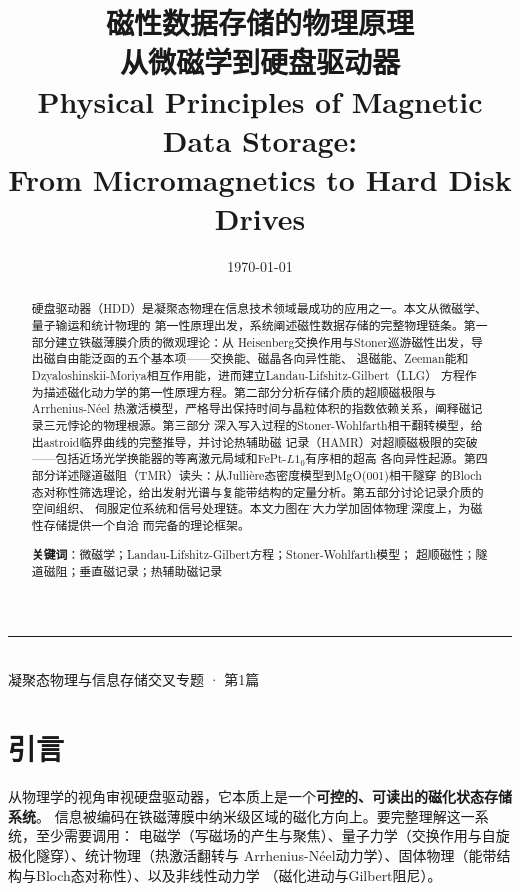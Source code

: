 \documentclass[11pt,a4paper,twoside]{article}
\title{
  {\Huge\bfseries 磁性数据存储的物理原理} \\[8pt]
  {\Large 从微磁学到硬盘驱动器} \\[12pt]
  {\normalsize Physical Principles of Magnetic Data Storage: \\
   From Micromagnetics to Hard Disk Drives}
}
\author{}
\date{\today}
\theoremstyle{definition}
\theoremstyle{plain}
\theoremstyle{remark}
\begin{document}
\maketitle

\begin{center}
\rule{0.8\textwidth}{0.5pt} \\[8pt]
{\small 凝聚态物理与信息存储交叉专题 · 第1篇} \\[4pt]
\end{center}

\begin{abstract}
\noindent
硬盘驱动器（HDD）是凝聚态物理在信息技术领域最成功的应用之一。本文从微磁学、量子输运和统计物理的
第一性原理出发，系统阐述磁性数据存储的完整物理链条。第一部分建立铁磁薄膜介质的微观理论：从
Heisenberg交换作用与Stoner巡游磁性出发，导出磁自由能泛函的五个基本项——交换能、磁晶各向异性能、
退磁能、Zeeman能和Dzyaloshinskii-Moriya相互作用能，进而建立Landau-Lifshitz-Gilbert（LLG）
方程作为描述磁化动力学的第一性原理方程。第二部分分析存储介质的超顺磁极限与Arrhenius-N\'{e}el
热激活模型，严格导出保持时间与晶粒体积的指数依赖关系，阐释磁记录三元悖论的物理根源。第三部分
深入写入过程的Stoner-Wohlfarth相干翻转模型，给出astroid临界曲线的完整推导，并讨论热辅助磁
记录（HAMR）对超顺磁极限的突破——包括近场光学换能器的等离激元局域和FePt-$L1_0$有序相的超高
各向异性起源。第四部分详述隧道磁阻（TMR）读头：从Julli\`{e}re态密度模型到MgO(001)相干隧穿
的Bloch态对称性筛选理论，给出发射光谱与复能带结构的定量分析。第五部分讨论记录介质的空间组织、
伺服定位系统和信号处理链。本文力图在\"四大力学加固体物理\"的深度上，为磁性存储提供一个自洽
而完备的理论框架。

\medskip
\noindent\textbf{关键词}：微磁学；Landau-Lifshitz-Gilbert方程；Stoner-Wohlfarth模型；
超顺磁性；隧道磁阻；垂直磁记录；热辅助磁记录
\end{abstract}

\tableofcontents
\newpage

\section{引言}
\label{sec:intro}

从物理学的视角审视硬盘驱动器，它本质上是一个\textbf{可控的、可读出的磁化状态存储系统}。
信息被编码在铁磁薄膜中纳米级区域的磁化方向上。要完整理解这一系统，至少需要调用：
电磁学（写磁场的产生与聚焦）、量子力学（交换作用与自旋极化隧穿）、统计物理（热激活翻转与
Arrhenius-N\'{e}el动力学）、固体物理（能带结构与Bloch态对称性）、以及非线性动力学
（磁化进动与Gilbert阻尼）。
\end{document}
